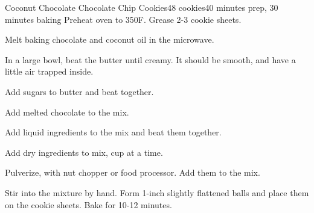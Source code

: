 \documentclass[../Cookbook.tex]{subfiles}
\begin{document}
\begin{recipe}{Coconut Chocolate Chocolate Chip Cookies}{48 cookies}{40 minutes prep, 30 minutes baking}
	Preheat oven to 350\0F. Grease 2-3 cookie sheets.

	Melt baking chocolate and coconut oil in the microwave.


	In a large bowl, beat the butter until creamy. It should be smooth, and have a little air trapped inside.

	Add sugars to butter and beat together.

	\newstep
	Add melted chocolate to the mix.

	Add liquid ingredients to the mix and beat them together.

	Add dry ingredients to mix,  cup at a time.

	Pulverize, with nut chopper or food processor. Add them to the mix.

	Stir into the mixture by hand. Form 1-inch slightly flattened balls and place them on the cookie sheets. Bake for 10-12 minutes.

\end{recipe}
\end{document}
